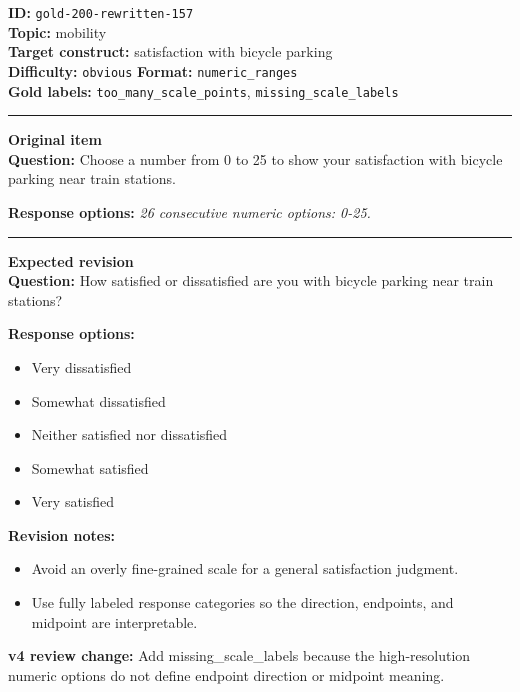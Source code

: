 \documentclass[10pt,a4paper]{article}
\newcommand{\sectionline}{\vspace{0.15em}\hrule\vspace{0.35em}}
\begin{document}
\begin{tcolorbox}[colframe=FlawRed,colback=white,colbacktitle=FlawRed!9,coltitle=black,title={Item 157\hfill Flawed item}]
\textbf{ID:} \texttt{gold-200-rewritten-157}\\
\textbf{Topic:} mobility\\
\textbf{Target construct:} satisfaction with bicycle parking\\
\textbf{Difficulty:} \texttt{obvious} \quad \textbf{Format:} \texttt{numeric\_ranges}\\
\textbf{Gold labels:} \texttt{too\_many\_scale\_points}, \texttt{missing\_scale\_labels}\\
\sectionline
\textbf{Original item}\\
\textbf{Question:} Choose a number from 0 to 25 to show your satisfaction with bicycle parking near train stations.
\par\textbf{Response options:}
\textit{26 consecutive numeric options: 0-25.}
\sectionline
\textbf{Expected revision}\\
\textbf{Question:} How satisfied or dissatisfied are you with bicycle parking near train stations?
\par\textbf{Response options:}
\begin{itemize}
\item Very dissatisfied
\item Somewhat dissatisfied
\item Neither satisfied nor dissatisfied
\item Somewhat satisfied
\item Very satisfied
\end{itemize}
\par\textbf{Revision notes:}
\begin{itemize}
\item Avoid an overly fine-grained scale for a general satisfaction judgment.
\item Use fully labeled response categories so the direction, endpoints, and midpoint are interpretable.
\end{itemize}
\par\textbf{v4 review change:} Add missing\_scale\_labels because the high-resolution numeric options do not define endpoint direction or midpoint meaning.
\end{tcolorbox}
\end{document}
